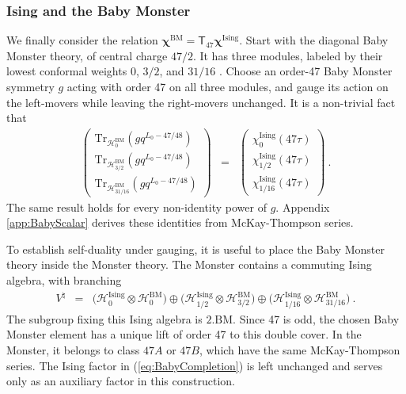 \documentclass[12pt]{article}
\numberwithin{equation}{section}
\newcommand{\bea}{\begin{eqnarray}}
\newcommand{\eea}{\end{eqnarray}}
\def\cH{\mathcal{H}}
\newcommand{\Tr}{\mathrm{Tr}}
\theoremstyle{remark}
\begin{document}
\subsubsection{Ising and the Baby Monster}
\label{sec:IsingBaby}

We finally consider the relation $\boldsymbol{\chi}^{\mathrm{BM}}=\mathsf T_{47}\boldsymbol{\chi}^{\mathrm{Ising}}$. Start with the diagonal Baby Monster theory, of central charge $47/2$. It has three modules, labeled by their lowest conformal weights $0$, $3/2$, and $31/16$ \cite{Hoehn:2007vut,Lin:2019hks}. Choose an order-47 Baby Monster symmetry $g$ acting with order 47 on all three modules, and gauge its action on the left-movers while leaving the right-movers unchanged.
It is a non-trivial fact that
\bea \label{eq:BabyCoverTraces}
\begin{pmatrix}
\Tr_{\cH^{\mathrm{BM}}_0}\!\left(gq^{L_0-47/48}\right)\\
\Tr_{\cH^{\mathrm{BM}}_{3/2}}\!\left(gq^{L_0-47/48}\right)\\
\Tr_{\cH^{\mathrm{BM}}_{31/16}}\!\left(gq^{L_0-47/48}\right)
\end{pmatrix}
&=&\begin{pmatrix}
\chi^{\mathrm{Ising}}_0(47\tau)\\
\chi^{\mathrm{Ising}}_{1/2}(47\tau)\\
\chi^{\mathrm{Ising}}_{1/16}(47\tau)
\end{pmatrix}~.
\eea
The same result holds for every non-identity power of $g$. Appendix \ref{app:BabyScalar} derives these identities from McKay-Thompson series. 




To establish self-duality under gauging, it is useful to place the Baby Monster theory inside the Monster theory. The Monster contains a commuting Ising algebra, with branching
\bea \label{eq:BabyCompletion}
V^\natural&=&\bigl(\cH^{\mathrm{Ising}}_0\otimes\cH^{\mathrm{BM}}_0\bigr)
\oplus\bigl(\cH^{\mathrm{Ising}}_{1/2}\otimes\cH^{\mathrm{BM}}_{3/2}\bigr)
\oplus\bigl(\cH^{\mathrm{Ising}}_{1/16}\otimes\cH^{\mathrm{BM}}_{31/16}\bigr)~.
\eea
The subgroup fixing this Ising algebra is $2.\mathrm{BM}$. Since 47 is odd, the chosen Baby Monster element has a unique lift of order 47 to this double cover. In the Monster, it belongs to class $47A$ or $47B$, which have the same McKay-Thompson series. The Ising factor in (\ref{eq:BabyCompletion}) is left unchanged and serves only as an auxiliary factor in this construction.
\end{document}
